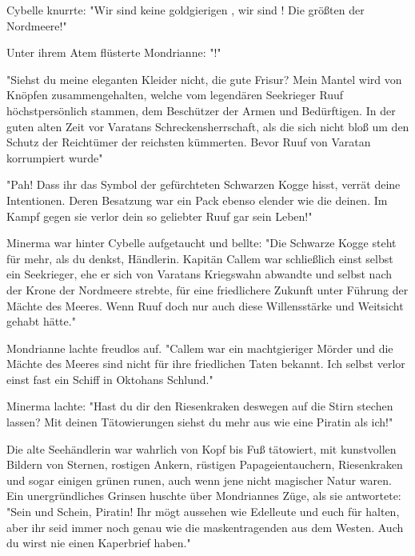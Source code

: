 Cybelle knurrte: "Wir sind keine goldgierigen , wir sind ! Die größten  der Nordmeere!" 

Unter ihrem Atem flüsterte Mondrianne: "!"

"Siehst du meine eleganten Kleider nicht, die gute Frisur? Mein Mantel wird von Knöpfen zusammengehalten, welche vom legendären Seekrieger Ruuf höchstpersönlich stammen, dem Beschützer der Armen und Bedürftigen. In der guten alten Zeit vor Varatans Schreckensherrschaft, als die  sich nicht bloß um den Schutz der Reichtümer der reichsten  kümmerten. Bevor Ruuf von Varatan korrumpiert wurde"

"Pah! Dass ihr das Symbol der gefürchteten Schwarzen Kogge hisst, verrät deine Intentionen. Deren Besatzung war ein Pack ebenso elender  wie die deinen. Im Kampf gegen sie verlor dein so geliebter Ruuf gar sein Leben!"

Minerma war hinter Cybelle aufgetaucht und bellte: "Die Schwarze Kogge steht für mehr, als du denkst, Händlerin. Kapitän Callem war schließlich einst selbst ein Seekrieger, ehe er sich von Varatans Kriegswahn abwandte und selbst nach der Krone der Nordmeere strebte, für eine friedlichere Zukunft unter Führung der Mächte des Meeres. Wenn Ruuf doch nur auch diese Willensstärke und Weitsicht gehabt hätte."

Mondrianne lachte freudlos auf. "Callem war ein machtgieriger Mörder und die Mächte des Meeres sind nicht für ihre friedlichen Taten bekannt. Ich selbst verlor einst fast ein Schiff in Oktohans Schlund."

Minerma lachte: "Hast du dir den Riesenkraken deswegen auf die Stirn stechen lassen? Mit deinen Tätowierungen siehst du mehr aus wie eine Piratin als ich!"

Die alte Seehändlerin war wahrlich von Kopf bis Fuß tätowiert, mit kunstvollen Bildern von Sternen, rostigen Ankern, rüstigen Papageientauchern, Riesenkraken und sogar einigen grünen runen, auch wenn jene nicht magischer Natur waren. Ein unergründliches Grinsen huschte über Mondriannes Züge, als sie antwortete: "Sein und Schein, Piratin! Ihr mögt aussehen wie Edelleute und euch für  halten, aber ihr seid immer noch genau wie die maskentragenden  aus dem Westen. Auch du wirst nie einen Kaperbrief haben."


